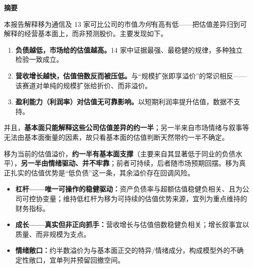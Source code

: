 \documentclass[UTF8, a4paper, fontset=none, zihao=-4]{ctexrep}
\begin{document}
\thispagestyle{fancy}
{\linespread{1.07}\selectfont
\vspace*{0.02cm}
{\sffamily\bfseries\color{ink}\fontsize{23}{28}\selectfont 摘要\par}
\vspace{7pt}{\color{brandblue}\rule{\textwidth}{1.1pt}\par}
\vspace{11pt}

本报告解释移为通信及 13 家可比公司的市值\emph{为何}有高有低——把估值差异归到可解释的经营基本面上，而非预测股价。主要发现如下。

\vspace{7pt}
\begin{enumerate}\setlength{\itemsep}{2pt}\setlength{\parskip}{0pt}\setlength{\topsep}{2pt}
\item \textbf{负债越低，市场给的估值越高。}14 家中证据最强、最稳健的规律，多种独立检验一致成立。
\item \textbf{营收增长越快，估值倍数反而被压低。}与“规模扩张即享溢价”的常识相反——该赛道对单纯的规模扩张给折价、而非溢价。
\item \textbf{盈利能力（利润率）对估值无可靠影响。}以短期利润率提升估值，数据不支持。
\end{enumerate}
并且，\textbf{基本面只能解释这些公司估值差异的约一半}；另一半来自市场情绪与叙事等无法由基本面衡量的因素，故只看基本面的估值判断天然带约一半不确定。

\vspace{7pt}
\par
移为当前的估值溢价，\textbf{约一半有基本面支撑}（主要来自其显著低于同业的负债水平），\textbf{另一半由情绪驱动、并不牢靠}；前者可持续，后者随市场预期回摆。移为真正扎实的估值优势是“低负债”这一条，其余溢价存在回调风险。

\vspace{7pt}
\begin{itemize}\setlength{\itemsep}{2pt}\setlength{\parskip}{0pt}\setlength{\topsep}{2pt}
\item \textbf{杠杆——唯一可操作的稳健驱动：}资产负债率与超额估值稳健负相关、且为公司可控协变量；维持低杠杆为移为可持续的估值优势来源，宜列为重点维持的财务指标。
\item \textbf{成长——真实但非正向抓手：}营收增长与估值倍数稳健负相关；增长叙事宜以质量、而非规模为支点。
\item \textbf{情绪敞口：}约半数溢价为与基本面正交的特异/情绪成分，构成模型外的不确定性敞口，宜单列并预留回撤空间。
\end{itemize}

}
\end{document}
